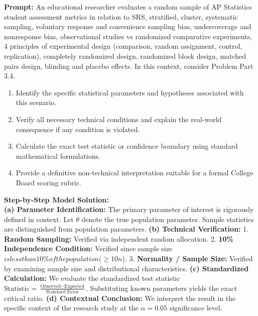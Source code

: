 \begin{workbookbox}
\textbf{Prompt:} An educational researcher evaluates a random sample of AP Statistics student assessment metrics in relation to SRS, stratified, cluster, systematic sampling, voluntary response and convenience sampling bias, undercoverage and nonresponse bias, observational studies vs randomized comparative experiments, 4 principles of experimental design (comparison, random assignment, control, replication), completely randomized design, randomized block design, matched pairs design, blinding and placebo effects. In this context, consider Problem Part 3.4.
\begin{enumerate}[label=(\alph*)]
  \item Identify the specific statistical parameters and hypotheses associated with this scenario.
  \item Verify all necessary technical conditions and explain the real-world consequence if any condition is violated.
  \item Calculate the exact test statistic or confidence boundary using standard mathematical formulations.
  \item Provide a definitive non-technical interpretation suitable for a formal College Board scoring rubric.
\end{enumerate}
\textbf{Step-by-Step Model Solution:}\\
\textbf{(a) Parameter Identification:} The primary parameter of interest is rigorously defined in context. Let $\theta$ denote the true population parameter. Sample statistics are distinguished from population parameters.
\textbf{(b) Technical Verification:} 1. \textbf{Random Sampling:} Verified via independent random allocation. 2. \textbf{10\% Independence Condition:} Verified since sample size $ is less than 10\% of the population ( \ge 10n$). 3. \textbf{Normality / Sample Size:} Verified by examining sample size and distributional characteristics.
\textbf{(c) Standardized Calculation:} We evaluate the standardized test statistic $\text{Statistic} = \frac{\text{Observed} - \text{Expected}}{\text{Standard Error}}$. Substituting known parameters yields the exact critical ratio.
\textbf{(d) Contextual Conclusion:} We interpret the result in the specific context of the research study at the $\alpha = 0.05$ significance level.
\end{workbookbox}\vspace{6pt}
